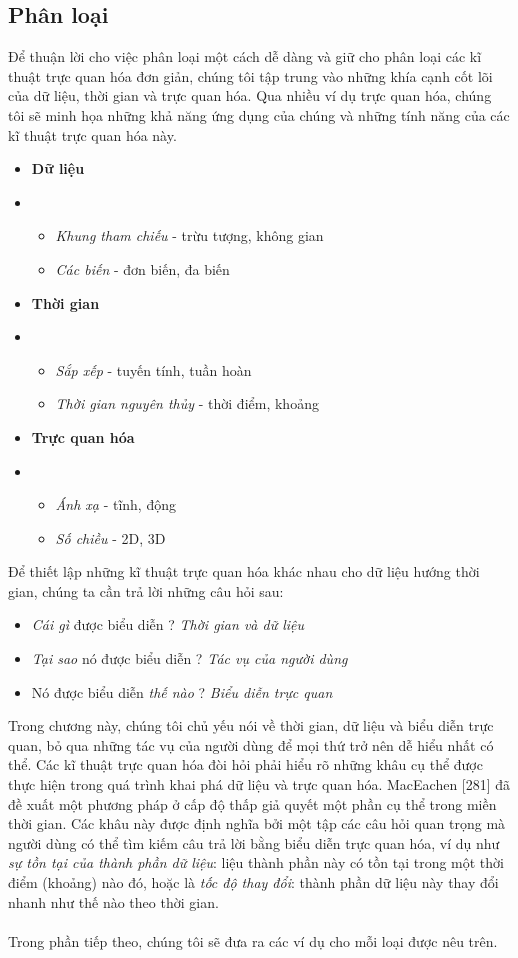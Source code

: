 \subsection{Phân loại}
Để thuận lời cho việc phân loại một cách dễ dàng và giữ cho phân loại các kĩ thuật trực quan hóa đơn giản, chúng tôi tập trung vào những khía cạnh cốt lõi của dữ liệu, thời gian và trực quan hóa. Qua nhiều ví dụ trực quan hóa, chúng tôi sẽ minh họa những khả năng ứng dụng của chúng và những tính năng của các kĩ thuật trực quan hóa này.
\begin{itemize}
    \item \textbf{Dữ liệu} 
    \item[] \begin{itemize}
        \item \textit{Khung tham chiếu} - trừu tượng, không gian
        \item \textit{Các biến} - đơn biến, đa biến
    \end{itemize}
    \item \textbf{Thời gian}
    \item[] \begin{itemize}
        \item \textit{Sắp xếp} - tuyến tính, tuần hoàn
        \item \textit{Thời gian nguyên thủy} - thời điểm, khoảng
    \end{itemize}
    \item \textbf{Trực quan hóa}
    \item[] \begin{itemize}
        \item \textit{Ánh xạ} - tĩnh, động
        \item \textit{Số chiều} - 2D, 3D
    \end{itemize}
\end{itemize}
Để thiết lập những kĩ thuật trực quan hóa khác nhau cho dữ liệu hướng thời gian, chúng ta cần trả lời những câu hỏi sau:
\begin{itemize}
    \item \textit{Cái gì} được biểu diễn ? \textit{Thời gian và dữ liệu}
    \item \textit{Tại sao} nó được biểu diễn ? \textit{Tác vụ của người dùng}
    \item Nó được biểu diễn \textit{thế nào} ? \textit{Biểu diễn trực quan}
\end{itemize}
Trong chương này, chúng tôi chủ yếu nói về thời gian, dữ liệu và biểu diễn trực quan, bỏ qua những tác vụ của người dùng để mọi thứ trở nên dễ hiểu nhất có thể. Các kĩ thuật trực quan hóa đòi hỏi phải hiểu rõ những khâu cụ thể được thực hiện trong quá trình khai phá dữ liệu và trực quan hóa. MacEachen [281] đã đề xuất một phương pháp ở cấp độ thấp giả quyết một phần cụ thể trong miền thời gian. Các khâu này được định nghĩa bởi một tập các câu hỏi quan trọng mà người dùng có thể tìm kiếm câu trả lời bằng biểu diễn trực quan hóa, ví dụ như \textit{sự tồn tại của thành phần dữ liệu}: liệu thành phần này có tồn tại trong một thời điểm (khoảng) nào đó, hoặc là \textit{tốc độ thay đổi}: thành phần dữ liệu này thay đổi nhanh như thế nào theo thời gian. 
\\ \\
Trong phần tiếp theo, chúng tôi sẽ đưa ra các ví dụ cho mỗi loại được nêu trên.

